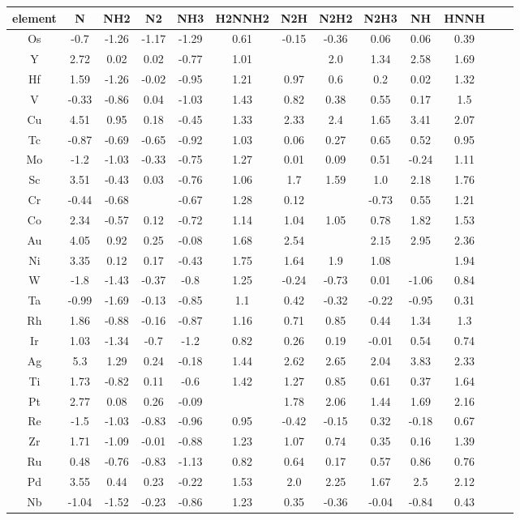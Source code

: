 \begin{center}
\begin{tabular}{| c | c | c | c | c | c | c | c | c | c | c | c | c |}
\hline
element & N & NH2 & N2 & NH3 & H2NNH2 & N2H & N2H2 & N2H3 & NH & HNNH\\
\hline

Os & -0.7 & -1.26 & -1.17 & -1.29 & 0.61 & -0.15 & -0.36 & 0.06 & 0.06 & 0.39 \\
Y & 2.72 & 0.02 & 0.02 & -0.77 & 1.01 &  & 2.0 & 1.34 & 2.58 & 1.69 \\
Hf & 1.59 & -1.26 & -0.02 & -0.95 & 1.21 & 0.97 & 0.6 & 0.2 & 0.02 & 1.32 \\
V & -0.33 & -0.86 & 0.04 & -1.03 & 1.43 & 0.82 & 0.38 & 0.55 & 0.17 & 1.5 \\
Cu & 4.51 & 0.95 & 0.18 & -0.45 & 1.33 & 2.33 & 2.4 & 1.65 & 3.41 & 2.07 \\
Tc & -0.87 & -0.69 & -0.65 & -0.92 & 1.03 & 0.06 & 0.27 & 0.65 & 0.52 & 0.95 \\
Mo & -1.2 & -1.03 & -0.33 & -0.75 & 1.27 & 0.01 & 0.09 & 0.51 & -0.24 & 1.11 \\
Sc & 3.51 & -0.43 & 0.03 & -0.76 & 1.06 & 1.7 & 1.59 & 1.0 & 2.18 & 1.76 \\
Cr & -0.44 & -0.68 &  & -0.67 & 1.28 & 0.12 &  & -0.73 & 0.55 & 1.21 \\
Co & 2.34 & -0.57 & 0.12 & -0.72 & 1.14 & 1.04 & 1.05 & 0.78 & 1.82 & 1.53 \\
Au & 4.05 & 0.92 & 0.25 & -0.08 & 1.68 & 2.54 &  & 2.15 & 2.95 & 2.36 \\
Ni & 3.35 & 0.12 & 0.17 & -0.43 & 1.75 & 1.64 & 1.9 & 1.08 &  & 1.94 \\
W & -1.8 & -1.43 & -0.37 & -0.8 & 1.25 & -0.24 & -0.73 & 0.01 & -1.06 & 0.84 \\
Ta & -0.99 & -1.69 & -0.13 & -0.85 & 1.1 & 0.42 & -0.32 & -0.22 & -0.95 & 0.31 \\
Rh & 1.86 & -0.88 & -0.16 & -0.87 & 1.16 & 0.71 & 0.85 & 0.44 & 1.34 & 1.3 \\
Ir & 1.03 & -1.34 & -0.7 & -1.2 & 0.82 & 0.26 & 0.19 & -0.01 & 0.54 & 0.74 \\
Ag & 5.3 & 1.29 & 0.24 & -0.18 & 1.44 & 2.62 & 2.65 & 2.04 & 3.83 & 2.33 \\
Ti & 1.73 & -0.82 & 0.11 & -0.6 & 1.42 & 1.27 & 0.85 & 0.61 & 0.37 & 1.64 \\
Pt & 2.77 & 0.08 & 0.26 & -0.09 &  & 1.78 & 2.06 & 1.44 & 1.69 & 2.16 \\
Re & -1.5 & -1.03 & -0.83 & -0.96 & 0.95 & -0.42 & -0.15 & 0.32 & -0.18 & 0.67 \\
Zr & 1.71 & -1.09 & -0.01 & -0.88 & 1.23 & 1.07 & 0.74 & 0.35 & 0.16 & 1.39 \\
Ru & 0.48 & -0.76 & -0.83 & -1.13 & 0.82 & 0.64 & 0.17 & 0.57 & 0.86 & 0.76 \\
Pd & 3.55 & 0.44 & 0.23 & -0.22 & 1.53 & 2.0 & 2.25 & 1.67 & 2.5 & 2.12 \\
Nb & -1.04 & -1.52 & -0.23 & -0.86 & 1.23 & 0.35 & -0.36 & -0.04 & -0.84 & 0.43 \\
\hline
\end{tabular}
\end{center}